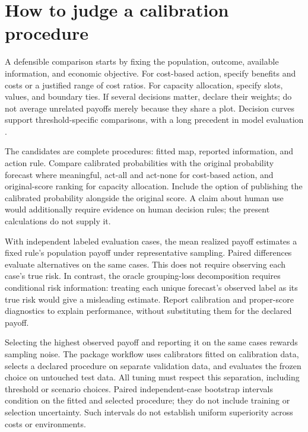 \documentclass[11pt]{article}
\begin{document}
\clearpage
\section{How to judge a calibration procedure}
A defensible comparison starts by fixing the population, outcome, available information, and economic objective. For cost-based action, specify benefits and costs or a justified range of cost ratios. For capacity allocation, specify slots, values, and boundary ties. If several decisions matter, declare their weights; do not average unrelated payoffs merely because they share a plot. Decision curves support threshold-specific comparisons, with a long precedent in model evaluation \citep{vickers2006}.

The candidates are complete procedures: fitted map, reported information, and action rule. Compare calibrated probabilities with the original probability forecast where meaningful, act-all and act-none for cost-based action, and original-score ranking for capacity allocation. Include the option of publishing the calibrated probability alongside the original score. A claim about human use would additionally require evidence on human decision rules; the present calculations do not supply it.

With independent labeled evaluation cases, the mean realized payoff estimates a fixed rule's population payoff under representative sampling. Paired differences evaluate alternatives on the same cases. This does not require observing each case's true risk. In contrast, the oracle grouping-loss decomposition requires conditional risk information: treating each unique forecast's observed label as its true risk would give a misleading estimate. Report calibration and proper-score diagnostics to explain performance, without substituting them for the declared payoff.

Selecting the highest observed payoff and reporting it on the same cases rewards sampling noise. The package workflow uses calibrators fitted on calibration data, selects a declared procedure on separate validation data, and evaluates the frozen choice on untouched test data. All tuning must respect this separation, including threshold or scenario choices. Paired independent-case bootstrap intervals condition on the fitted and selected procedure; they do not include training or selection uncertainty. Such intervals do not establish uniform superiority across costs or environments.
\end{document}
